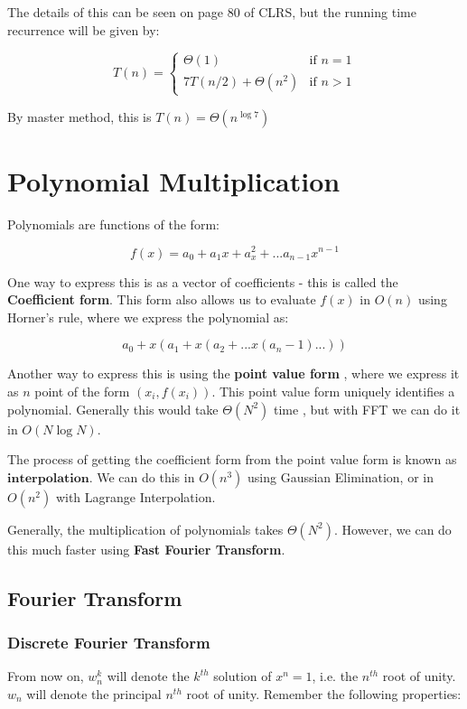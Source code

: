 \documentclass[12pt,letterpaper]{article}
\theoremstyle{definition}
\begin{document}
The details of this can be seen on page 80 of CLRS, but the running time recurrence will be given by:

\[T(n) = \begin{cases}
  \Theta(1) & \text{if } n = 1 \\
  7T(n/2) + \Theta(n^2) & \text{if } n > 1
\end{cases}\]

By master method, this is $T(n) = \Theta(n^{\log7})$

\section{Polynomial Multiplication}

Polynomials are functions of the form:

\[f(x) = a_0 + a_1x + a_x^2 + ... a_{n-1}x^{n-1}\]

One way to express this is as a vector of coefficients  - this is called the \textbf{Coefficient form}. This form also allows us to evaluate $f(x)$ in $O(n)$ using Horner's rule, where we express the polynomial as:

\[a_0 + x(a_1 + x(a_2 + ...x(a_n-1)...))\]

Another way to express this is using the \textbf{point value form} , where we express it as $n$ point of the form $(x_i,f(x_i))$. This point value form uniquely identifies a polynomial. Generally this would take $\Theta(N^2)$ time , but with FFT we can do it in $O(N\log N)$.

The process of getting the coefficient form from the point value form is known as $\textbf{interpolation}$.  We can do this in $O(n^3)$ using Gaussian Elimination, or in $O(n^2)$ with Lagrange Interpolation.

Generally, the multiplication of polynomials takes $\Theta(N^2)$. However, we can do this much faster using \textbf{Fast Fourier Transform}.

\subsection{Fourier Transform}

\subsubsection{Discrete Fourier Transform}

From now on, $w_n^k$ will denote the $k^{th}$ solution of $x^n=1$, i.e. the $n^{th}$ root of unity. $w_n$ will denote the principal $n^{th}$ root of unity. Remember the following properties:
\end{document}

